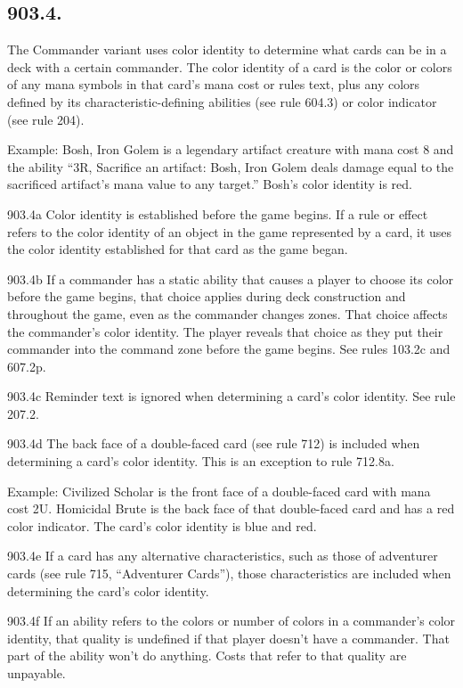 \subsection*{903.4.}
The Commander variant uses color identity to determine what cards can be in a deck with a certain commander. The color identity of a card is the color or colors of any mana symbols in that card’s mana cost or rules text, plus any colors defined by its characteristic-defining abilities (see rule 604.3) or color indicator (see rule 204).

Example: Bosh, Iron Golem is a legendary artifact creature with mana cost {8} and the ability “{3}{R}, Sacrifice an artifact: Bosh, Iron Golem deals damage equal to the sacrificed artifact’s mana value to any target.” Bosh’s color identity is red.

903.4a Color identity is established before the game begins. If a rule or effect refers to the color identity of an object in the game represented by a card, it uses the color identity established for that card as the game began.

903.4b If a commander has a static ability that causes a player to choose its color before the game begins, that choice applies during deck construction and throughout the game, even as the commander changes zones. That choice affects the commander’s color identity. The player reveals that choice as they put their commander into the command zone before the game begins. See rules 103.2c and 607.2p.

903.4c Reminder text is ignored when determining a card’s color identity. See rule 207.2.

903.4d The back face of a double-faced card (see rule 712) is included when determining a card’s color identity. This is an exception to rule 712.8a.

Example: Civilized Scholar is the front face of a double-faced card with mana cost {2}{U}. Homicidal Brute is the back face of that double-faced card and has a red color indicator. The card’s color identity is blue and red.

903.4e If a card has any alternative characteristics, such as those of adventurer cards (see rule 715, “Adventurer Cards”), those characteristics are included when determining the card’s color identity.

903.4f If an ability refers to the colors or number of colors in a commander’s color identity, that quality is undefined if that player doesn’t have a commander. That part of the ability won’t do anything. Costs that refer to that quality are unpayable.

